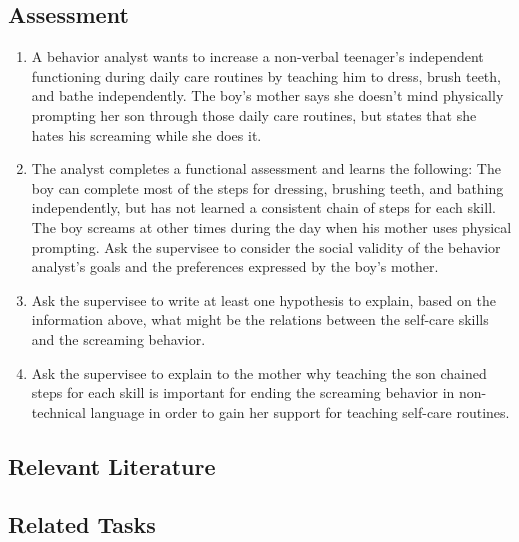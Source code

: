 \subsection{Assessment}
\begin{enumerate}
\item A behavior analyst wants to increase a non-verbal teenager's independent functioning during daily care routines by teaching him to dress, brush teeth, and bathe independently. The boy's mother says she doesn't mind physically prompting her son through those daily care routines, but states that she hates his screaming while she does it.

\item The analyst completes a functional assessment and learns the following: The boy can complete most of the steps for dressing, brushing teeth, and bathing independently, but has not learned a consistent chain of steps for each skill. The boy screams at other times during the day when his mother uses physical prompting. Ask the supervisee to consider the social validity of the behavior analyst's goals and the preferences expressed by the boy's mother. 

\item Ask the supervisee to write at least one hypothesis to explain, based on the information above, what might be the relations between the self-care skills and the screaming behavior.

\item Ask the supervisee to explain to the mother why teaching the son chained steps for each skill is important for ending the screaming behavior in non-technical language in order to gain her support for teaching self-care routines.
\end{enumerate}
%
\subsection{Relevant Literature}
\begin{refsection}
\nocite{cooper2007applied,
        fawcett1991social,
        wolf1978social}
\printbibliography[heading=none]
\end{refsection}
%
\subsection{Related Tasks}
\fourgSix{}\\
\fourgEight{}\\
\fouriSix{}\\
\fourjFour{}\\
\fourjFive{}\\
\fourjSix{}\\
\fourjTwelve{}\\
\fourkTwo{}\\
\fourkThree{}\\
\fourkNine{}\\
%
\clearpage \section[\fourgThree{}]{\fourgThree{}%
              }
